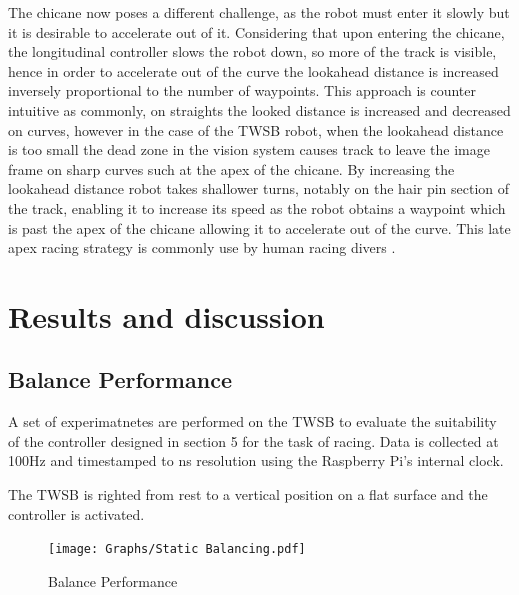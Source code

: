             The chicane now poses a different challenge, as the robot must enter it slowly but it is desirable to accelerate out of it.
            Considering that upon entering the chicane, the longitudinal controller slows the robot down, so more of the track is visible, 
            hence in order to accelerate out of the curve the lookahead distance is increased inversely proportional to the number of waypoints. 
            This approach is counter intuitive as commonly, on straights the looked distance is increased 
            and decreased on curves, however in the case of the TWSB robot, when the lookahead distance is too small the dead zone
            in the vision system causes track to leave the image frame on sharp curves such at the apex of
            the chicane. By increasing the lookahead distance robot takes shallower turns, notably on the hair pin section of the track, enabling it to 
            increase its speed as the robot obtains a waypoint which is past the apex of the chicane allowing it to accelerate out 
            of the curve. This late apex racing strategy is commonly use by human racing divers \cite{kegelman2017insights}.
        
    \pagebreak{}


  \section{Results and discussion} %
    \subsection{Balance Performance}
    A set of experimatnetes are performed on the TWSB to evaluate the suitability of the controller designed in section 5 for the task of racing. 
    Data is collected at 100Hz and timestamped to ns resolution using the Raspberry Pi's internal clock. 

    The TWSB is righted from rest to a vertical position on a flat surface and the controller is activated. 
    \begin{figure}[H]
        \centering
        \texttt{[image: Graphs/Static Balancing.pdf]}
        \caption{Balance Performance}
        \label{fig:BalancePerformance}
    \end{figure}

